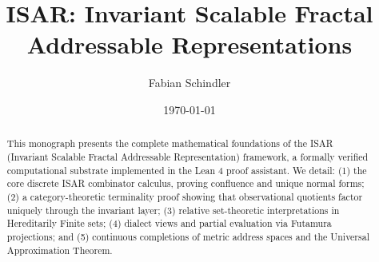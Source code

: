 \documentclass{report}
\title{ISAR: Invariant Scalable Fractal Addressable Representations}
\author{Fabian Schindler}
\date{\today}
\begin{document}
\maketitle

\begin{abstract}
This monograph presents the complete mathematical foundations of the ISAR (Invariant Scalable Fractal Addressable Representation) framework, a formally verified computational substrate implemented in the Lean 4 proof assistant. We detail: (1) the core discrete ISAR combinator calculus, proving confluence and unique normal forms; (2) a category-theoretic terminality proof showing that observational quotients factor uniquely through the invariant layer; (3) relative set-theoretic interpretations in Hereditarily Finite sets; (4) dialect views and partial evaluation via Futamura projections; and (5) continuous completions of metric address spaces and the Universal Approximation Theorem.
\end{abstract}


\end{document}
